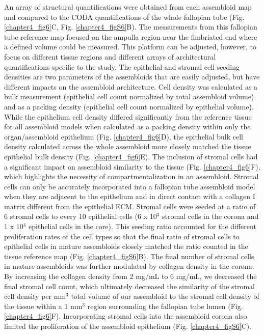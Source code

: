 \begin{refsection}
    An array of structural quantifications were obtained from each assembloid map and compared to the CODA quantifications of the whole fallopian tube (Fig. \ref{chapter4_fig6}C, Fig. \ref{chapter4_figS6}B). The measurements from this fallopian tube reference map focused on the ampulla region near the fimbriated end where a defined volume could be measured. This platform can be adjusted, however, to focus on different tissue regions and different arrays of architectural quantifications specific to the study. The epithelial and stromal cell seeding densities are two parameters of the assembloids that are easily adjusted, but have different impacts on the assembloid architecture. Cell density was calculated as a bulk measurement (epithelial cell count normalized by total assembloid volume) and as a packing density (epithelial cell count normalized by epithelial volume). While the epithelium cell density differed significantly from the reference tissue for all assembloid models when calculated as a packing density within only the organ/assembloid epithelium (Fig. \ref{chapter4_fig6}D), the epithelial bulk cell density calculated across the whole assembloid more closely matched the tissue epithelial bulk density (Fig. \ref{chapter4_fig6}E). 
    The inclusion of stromal cells had a significant impact on assembloid similarity to the tissue (Fig. \ref{chapter4_fig6}F), which highlights the necessity of compartmentalization in an assembloid. Stromal cells can only be accurately incorporated into a fallopian tube assembloid model when they are adjacent to the epithelium and in direct contact with a collagen I matrix different from the epithelial ECM\cite{lengyel2022a}. Stromal cells were seeded at a ratio of 6 stromal cells to every 10 epithelial cells (6 x 10$^3$ stromal cells in the corona and 1 x 10$^4$ epithelial cells in the core). This seeding ratio accounted for the different proliferation rates of the cell types so that the final ratio of stromal cells to epithelial cells in mature assembloids closely matched the ratio counted in the tissue reference map (Fig. \ref{chapter4_figS6}B). The final number of stromal cells in mature assembloids was further modulated by collagen density in the corona. By increasing the collagen density from 2 mg/mL to 6 mg/mL, we decreased the final stromal cell count, which ultimately decreased the similarity of the stromal cell density per mm$^3$ total volume of our assembloid to the stromal cell density of the tissue within a 1 mm$^3$ region surrounding the fallopian tube lumen (Fig. \ref{chapter4_fig6}F). Incorporating stromal cells into the assembloid corona also limited the proliferation of the assembloid epithelium (Fig. \ref{chapter4_figS6}C). 

\end{refsection}
